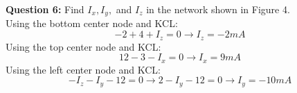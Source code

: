\documentclass{article}
\begin{document}
\textbf{Question 6:} Find $I_x,I_y,$ and $I_z$ in the network shown in Figure 4.
\\
Using the bottom center node and KCL:
\[ -2 + 4 + I_z = 0 \rightarrow I_z = -2mA \]
Using the top center node and KCL:
\[12-3-I_x = 0 \rightarrow I_x = 9mA \]
Using the left center node and KCL:
\[ -I_z - I_y - 12 = 0 \rightarrow 2-I_y-12=0 \rightarrow I_y=-10mA \]
\end{document}
